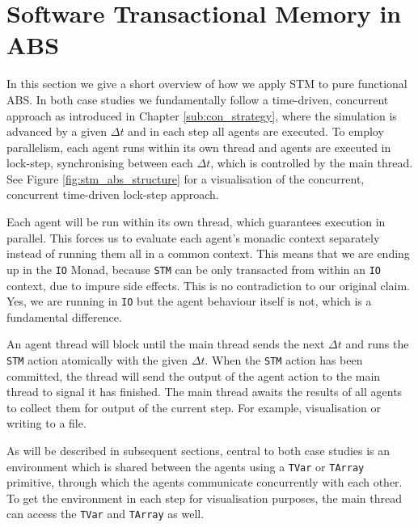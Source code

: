 \section{Software Transactional Memory in ABS}
\label{sec:stm_abs}
In this section we give a short overview of how we apply STM to pure functional ABS. In both case studies we fundamentally follow a time-driven, concurrent approach as introduced in Chapter \ref{sub:con_strategy}, where the simulation is advanced by a given $\Delta t$ and in each step all agents are executed. To employ parallelism, each agent runs within its own thread and agents are executed in lock-step, synchronising between each $\Delta t$, which is controlled by the main thread. See Figure \ref{fig:stm_abs_structure} for a visualisation of the concurrent, concurrent time-driven lock-step approach.

Each agent will be run within its own thread, which guarantees execution in parallel. This forces us to evaluate each agent's monadic context separately instead of running them all in a common context. This means that we are ending up in the \texttt{IO} Monad, because \texttt{STM} can be only transacted from within an \texttt{IO} context, due to impure side effects. This is no contradiction to our original claim. Yes, we are running in \texttt{IO} but the agent behaviour itself is not, which is a fundamental difference.

An agent thread will block until the main thread sends the next $\Delta t$ and runs the \texttt{STM} action atomically with the given $\Delta t$. When the \texttt{STM} action has been committed, the thread will send the output of the agent action to the main thread to signal it has finished. The main thread awaits the results of all agents to collect them for output of the current step. For example, visualisation or writing to a file.

As will be described in subsequent sections, central to both case studies is an environment which is shared between the agents using a \texttt{TVar} or \texttt{TArray} primitive, through which the agents communicate concurrently with each other. To get the environment in each step for visualisation purposes, the main thread can access the \texttt{TVar} and \texttt{TArray} as well. 

